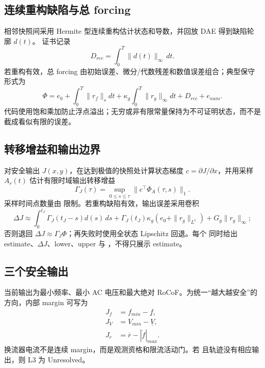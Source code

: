 \subsection{连续重构缺陷与总 forcing}

相邻快照间采用 Hermite 型连续重构估计状态和导数，并回放 DAE 得到缺陷轮廓 $d(t)$。
证书记录
\begin{equation}
 D_{rec}=\int_0^T\|d(t)\|_\infty\,dt.
\end{equation}
若重构有效，总 forcing 由初始误差、微分/代数残差和数值误差组合；典型保守形式为
\begin{equation}
 \Phi=e_0+\int_0^T\|r_f\|_sdt
 +\kappa_g\int_0^T\|r_g\|_\infty dt+D_{rec}+e_{num}.
\end{equation}
代码使用饱和乘加防止浮点溢出；无穷或非有限常量保持为不可证明状态，而不是截成看似有限的误差。

\subsection{转移增益和输出边界}

对安全输出 $J(x,y)$，在达到极值的快照处计算状态梯度 $c=\partial J/\partial x$，并用采样
$A_r(t)$ 估计有限时域输出转移增益
\begin{equation}
 \Gamma_J(\tau)=\sup_{0\le s\le\tau}
 \|c^\top\Phi_A(\tau,s)\|_1.
\end{equation}
采样时间点数量由  限制。若重构缺陷有效，输出误差采用卷积
\begin{equation}
 \Delta J\approx\int_0^{t_J}\Gamma_J(t_J-s)d(s)\,ds
 +\Gamma_J(t_J)\kappa_g(e_0+\|r_g\|_{L^1})
 +G_y\|r_g\|_\infty;
\end{equation}
否则退回 $\Delta J\approx\Gamma_J\Phi$；再失败时使用全状态 Lipschitz 回退。每个
 同时给出 estimate、$\Delta J$、lower、upper 与
，不得只展示 estimate。

\subsection{三个安全输出}

当前输出为最小频率、最小 AC 电压和最大绝对 RoCoF。为统一“越大越安全”的方向，内部 margin
可写为
\begin{align}
 J_f&=f_{min}-\underline f,\\
 J_V&=V_{min}-\underline V,\\
 J_r&=\overline r-|\dot f|_{max}.
\end{align}
换流器电流不是连续 margin，而是观测资格和限流活动门。若
 且轨迹没有相应输出，则 L3 为 Unresolved。

